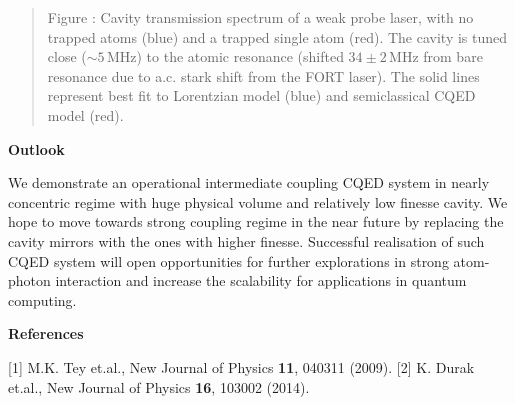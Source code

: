 \documentclass[portrait,a0,final]{a0poster} %
\makeatletter
\newenvironment{figurehere}
  {\def\@captype{figure}}
  {}
\newcommand{\figcaption}[1]{
  \vspace{0.5cm}
  \begin{center}
  \begin{quote}
    {\large {\sc Figure} \arabic{figure}: #1}
  \end{quote}
  \end{center}
  \stepcounter{figure}
}
\newenvironment{poster}{
  \begin{center}
  \begin{minipage}[c]{0.98\textwidth}
}{
  \end{minipage}
  \end{center}
}
\makeatother
\begin{document}
\begin{poster}
\begin{multicols}{2}
\begin{figurehere}
\vspace{-1cm}

    \figcaption{Cavity transmission spectrum of a weak probe laser, with no trapped atoms (blue) and a trapped single atom (red). The cavity is tuned close ($\sim 5 \, \mathrm{MHz}$) to the atomic resonance (shifted $34 \pm 2 \, \mathrm{MHz}$ from bare resonance due to a.c. stark shift from the FORT laser). The solid lines represent best fit to Lorentzian model (blue) and semiclassical CQED model (red).
}
\end{figurehere}


\begin{center}
  {\bf \Large \textsf {Outlook}}
\end{center}

We demonstrate an operational intermediate coupling CQED system in nearly concentric regime with huge physical volume and relatively low finesse cavity. We hope to move towards strong coupling regime in the near future by replacing the cavity mirrors with the ones with higher finesse. Successful realisation of such CQED system will open opportunities for further explorations in strong atom-photon interaction and increase the scalability for applications in quantum computing. 
\begin{flushleft}
       \begin{center}{\bf \large \textsf {References}}\end{center}
       [1] M.K. Tey et.al., New Journal of Physics {\textbf{11}}, 040311 (2009).
	     \newline
	     [2] K. Durak et.al., New Journal of Physics {\textbf{16}}, 103002 (2014).

\end{flushleft}

\end{multicols}

\end{poster}
\end{document}
